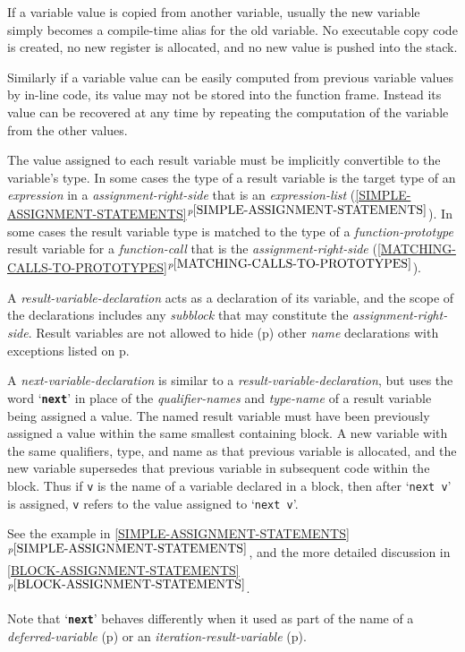 \documentclass[12pt]{article}
\makeatletter
\newcommand{\TT}[1]{{\tt \bfseries #1}}
\newcommand{\ttkey}[1]{\TT{#1}\index{#1@{\tt #1}}}
\newcommand{\itemref}[1]{\ref{#1}$^{p\pageref{#1}}$}
\newcommand{\pagref}[1]{p\pageref{#1}}
\makeatother
\begin{document}
If a variable value is copied from another variable, usually the
new variable simply becomes a compile-time alias for the old variable.
No executable copy code is created, no new register is allocated, and no new
value is pushed into the stack.

Similarly if a variable value can be easily computed from previous variable
values by in-line code, 
its value may not be stored into the function frame.  Instead its
value can be recovered at any time by repeating the computation
of the variable from the other values.

The value assigned to each result variable must be implicitly convertible to
the variable's type.  In some cases the type of a result variable is
the target type of an {\em expression} in a {\em assignment-right-side}
that is an {\em expression-list}
(\itemref{SIMPLE-ASSIGNMENT-STATEMENTS}).
In some cases the result variable type is matched to
the type of a {\em function-prototype} result variable
for a {\em function-call} that is the {\em assignment-right-side}
(\itemref{MATCHING-CALLS-TO-PROTOTYPES}).

A {\em result-variable-declaration} acts
as a declaration of its variable,
and the scope of the declarations includes any {\em subblock} that may
constitute the {\em assignment-right-side}.
Result variables are not allowed to hide (\pagref{HIDE})
other {\em name} declarations with exceptions listed on
\pagref{HIDING-EXCEPTIONS}.

A {\em next-variable-declaration} is similar to a
{\em result-variable-declaration}, but uses the word
`\ttkey{next}'\label{NEXT} in
place of the {\em qualifier-names} and {\em type-name}
of a result variable being assigned a value.  The named result variable must
have been previously assigned a value within the same smallest containing block.
A new variable with the same qualifiers, type, and name
as that previous variable is allocated,
and the new variable supersedes that previous variable
in subsequent code within the block.  Thus if {\tt v} is the name
of a variable declared in a block, then after `{\tt next v}' is
assigned, {\tt v} refers to the value assigned to `{\tt next v}'.

See the example in \itemref{SIMPLE-ASSIGNMENT-STATEMENTS}, and
the more detailed discussion in 
\itemref{BLOCK-ASSIGNMENT-STATEMENTS}.

Note that `\TT{next}' behaves differently when it used as part of
the name of
a {\em deferred-variable} (\pagref{DEFERRED-VARIABLE})
or an {\em iteration-result-variable} (\pagref{ITERATION-RESULT-VARIABLE}).
\end{document}
